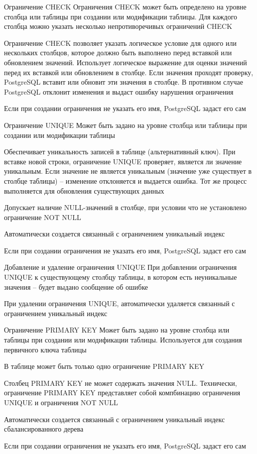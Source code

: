 \documentclass[12pt]{article}
\begin{document}
\begin{nota}{Ограничение CHECK}
    Ограничения CHECK может быть определено на уровне столбца или таблицы при создании или модификации таблицы. Для каждого столбца можно указать несколько непротиворечивых ограничений CHECK 

    Ограничение CHECK позволяет указать логическое условие для одного или нескольких столбцов, которое должно быть выполнено перед вставкой или обновлением значений. Использует логическое выражение для оценки значений перед их вставкой или обновлением в столбце. Если значения проходят проверку, PostgreSQL вставит или обновит эти значения в столбце. В противном случае PostgreSQL отклонит изменения и выдаст ошибку нарушения ограничения 

    Если при создании ограничения не указать его имя, PostgreSQL задаст его сам 
\end{nota}

\begin{nota}{Ограничение UNIQUE}
    Может быть задано на уровне столбца или таблицы при создании или модификации таблицы

    Обеспечивает уникальность записей в таблице (альтернативный ключ). При вставке новой строки, ограничение UNIQUE проверяет, является ли значение уникальным. Если значение не является уникальным (значение уже существует в столбце таблицы) -- изменение отклоняется и выдается ошибка. Тот же процесс выполняется для обновления существующих данных 

    Допускает наличие NULL-значений в столбце, при условии что не установлено ограничение NOT NULL

    Автоматически создается связанный с ограничением уникальный индекс 

    Если при создании ограничения не указать его имя, PostgreSQL задаст его сам
\end{nota}

\begin{Remark}{Добавление и удаление ограничения UNIQUE}
    При добавлении ограничения UNIQUE к существующему столбцу таблицы, в котором есть неуникальные значения -- будет выдано сообщение об ошибке
    
    При удалении ограничения UNIQUE, автоматически удаляется связанный с ограничением уникальный индекс
\end{Remark}

\begin{nota}{Ограничение PRIMARY KEY}
    Может быть задано на уровне столбца или таблицы при создании или модификации таблицы. Используется для создания первичного ключа таблицы

    В таблице может быть только одно ограничение PRIMARY KEY

    Столбец PRIMARY KEY не может содержать значения NULL. Технически, ограничение PRIMARY KEY представляет собой компбинацию ограничения UNIQUE и ограничения NOT NULL

    Автоматически создается связанный с ограничением уникальный индекс сбалансированного дерева

    Если при создании ограничения не указать его имя, PostgreSQL задаст его сам
\end{nota}
\end{document}
